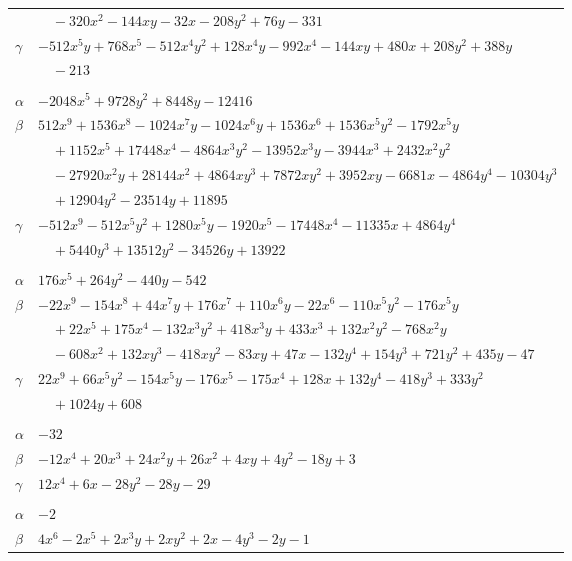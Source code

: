 \documentclass[11pt]{article}
\begin{document}
\begin{longtable}{@{}ll@{}}
 & $\quad -320x^{2}-144xy-32x-208y^{2}+76y-331$\\
$\gamma$ & $-512x^{5}y+768x^{5}-512x^{4}y^{2}+128x^{4}y-992x^{4}-144xy+480x+208y^{2}+388y$\\
 & $\quad -213$\\
\addlinespace[3pt]
\multicolumn{2}{@{}l}{$\{i,j\}=\{34,40\}$, $k_{ij}=2^{2}\cdot 7^{2}\cdot 13$}\\
$\alpha$ & $-2048x^{5}+9728y^{2}+8448y-12416$\\
$\beta$ & $512x^{9}+1536x^{8}-1024x^{7}y-1024x^{6}y+1536x^{6}+1536x^{5}y^{2}-1792x^{5}y$\\
 & $\quad +1152x^{5}+17448x^{4}-4864x^{3}y^{2}-13952x^{3}y-3944x^{3}+2432x^{2}y^{2}$\\
 & $\quad -27920x^{2}y+28144x^{2}+4864xy^{3}+7872xy^{2}+3952xy-6681x-4864y^{4}-10304y^{3}$\\
 & $\quad +12904y^{2}-23514y+11895$\\
$\gamma$ & $-512x^{9}-512x^{5}y^{2}+1280x^{5}y-1920x^{5}-17448x^{4}-11335x+4864y^{4}$\\
 & $\quad +5440y^{3}+13512y^{2}-34526y+13922$\\
\addlinespace[3pt]
\multicolumn{2}{@{}l}{$\{i,j\}=\{35,37\}$, $k_{ij}=2^{6}\cdot 7$}\\
$\alpha$ & $176x^{5}+264y^{2}-440y-542$\\
$\beta$ & $-22x^{9}-154x^{8}+44x^{7}y+176x^{7}+110x^{6}y-22x^{6}-110x^{5}y^{2}-176x^{5}y$\\
 & $\quad +22x^{5}+175x^{4}-132x^{3}y^{2}+418x^{3}y+433x^{3}+132x^{2}y^{2}-768x^{2}y$\\
 & $\quad -608x^{2}+132xy^{3}-418xy^{2}-83xy+47x-132y^{4}+154y^{3}+721y^{2}+435y-47$\\
$\gamma$ & $22x^{9}+66x^{5}y^{2}-154x^{5}y-176x^{5}-175x^{4}+128x+132y^{4}-418y^{3}+333y^{2}$\\
 & $\quad +1024y+608$\\
\addlinespace[3pt]
\multicolumn{2}{@{}l}{$\{i,j\}=\{36,38\}$, $k_{ij}=3^{2}$}\\
$\alpha$ & $-32$\\
$\beta$ & $-12x^{4}+20x^{3}+24x^{2}y+26x^{2}+4xy+4y^{2}-18y+3$\\
$\gamma$ & $12x^{4}+6x-28y^{2}-28y-29$\\
\addlinespace[3pt]
\multicolumn{2}{@{}l}{$\{i,j\}=\{37,39\}$, $k_{ij}=2^{2}$}\\
$\alpha$ & $-2$\\
$\beta$ & $4x^{6}-2x^{5}+2x^{3}y+2xy^{2}+2x-4y^{3}-2y-1$\\

\end{longtable}
\end{document}
